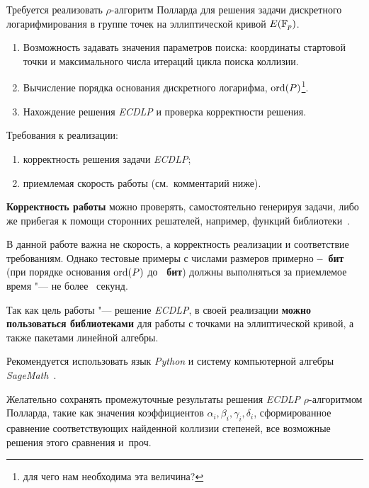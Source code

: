 \documentclass{ca-capstone}
\begin{document}

\goal
Требуется реализовать $\rho$-алгоритм Полларда для решения задачи дискретного
логарифмирования в группе точек на эллиптической кривой $E(\mathbb{F}_{p})$.

\functionality
\begin{enumerate}
  \item Возможность задавать значения параметров поиска: координаты стартовой точки и
    максимального числа итераций цикла поиска коллизии.
  \item Вычисление порядка основания дискретного логарифма,
    $\operatorname{ord}(P)$\footnote{для чего нам необходима эта величина?}.
  \item Нахождение решения \emph{ECDLP} и проверка корректности решения.
\end{enumerate}

\requirements
Требования к реализации:
\begin{enumerate}
  \item корректность решения задачи \emph{ECDLP};
  \item приемлемая скорость работы (см.\ комментарий ниже).
\end{enumerate}

\textbf{Корректность работы} можно проверять, самостоятельно генерируя задачи, либо же
прибегая к помощи сторонних решателей, например, функций библиотеки~\cite{sagemath}.

В данной работе важна не скорость, а корректность реализации и соответствие требованиям.
Однако тестовые примеры с числами размеров примерно
\textbf{\ReqPBitsLo--\ReqPBitsHi~бит} (при порядке основания $\operatorname{ord}(P)$ до
\textbf{\ReqOrderBits~бит}) должны выполняться за приемлемое время "--- не более
\ReqSeconds~секунд.

\details
Так как цель работы "--- решение \emph{ECDLP}, в своей реализации \textbf{можно пользоваться
библиотеками} для работы с точками на эллиптической кривой, а также пакетами линейной
алгебры.

Рекомендуется использовать язык \emph{Python} и систему компьютерной алгебры
\emph{SageMath}~\cite{sagemath}.

Желательно сохранять промежуточные результаты решения \emph{ECDLP} $\rho$-алгоритмом
Полларда, такие как значения коэффициентов $\alpha_i, \beta_i, \gamma_i, \delta_i$,
сформированное сравнение соответствующих найденной коллизии степеней, все возможные решения
этого сравнения и~проч.
\end{document}
